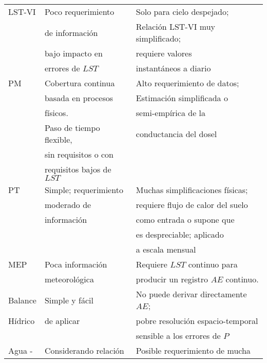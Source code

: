 \begin{longtable}{l|l|l}
LST-VI          & Poco requerimiento      & Solo  para cielo despejado;         \\
                & de información           & Relación LST-VI muy simplificado;   \\
                & bajo impacto en          &   requiere valores                  \\
                & errores de $LST$         & instantáneos a diario     \\ \hline
PM              & Cobertura continua       & Alto requerimiento de datos;          \\
                & basada en procesos       & Estimación simplificada o           \\
                & físicos.                  & semi-empírica de la                 \\
                & Paso de tiempo flexible, & conductancia del dosel              \\
                & sin requisitos o con     &                                     \\
                & requisitos bajos de $LST$  &                                     \\ \hline
PT              & Simple; requerimiento    & Muchas simplificaciones físicas;     \\
                & moderado de              & requiere flujo de calor del suelo   \\
                & información              & como entrada o supone que           \\
                &                          & es despreciable; aplicado             \\ 
                &                          & a escala mensual                    \\ \hline
MEP             & Poca información         & Requiere $LST$ continuo para            \\
                & meteorológica            & producir un registro $AE$ continuo.     \\ \hline
Balance         & Simple y fácil           & No puede derivar directamente $AE$;    \\
Hídrico         & de aplicar               & pobre resolución espacio-temporal   \\
                &                          & sensible a los errores de $P$         \\ \hline
Agua -          & Considerando relación    & Posible requerimiento de mucha      \\

\end{longtable}
